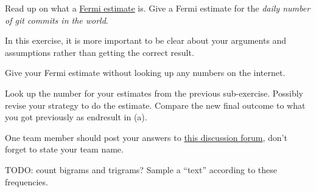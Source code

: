 \documentclass[a4paper,10pt,landscape,twocolumn]{scrartcl}
\begin{document}
\begin{exercise}
Read up on what a
\href{https://en.wikipedia.org/wiki/Fermi_problem}{Fermi estimate}
is. Give a Fermi estimate for the \emph{daily number of git commits
in the world}.
 
In this exercise, it is more important to be clear about your
arguments and assumptions rather than getting the correct result.

\begin{subex}[(4pt)]
Give your Fermi estimate without looking up any numbers on the internet.
\end{subex}

\begin{subex}[(4pt)]
Look up the number for your estimates from the previous
sub-exercise. Possibly revise your strategy to do the
estimate. Compare the new final outcome to what you got previously as
endresult in (a).
\end{subex}

One team member should post your answers to
\href{https://canvas.uva.nl/courses/2205/discussion_topics/23268}{this
  discussion forum}, don't forget to state your team name.
\end{exercise}

\begin{exercise}[Programming... (5pt)]
TODO: count bigrams and trigrams? Sample a ``text'' according to these frequencies.
\end{exercise}
\end{document}
